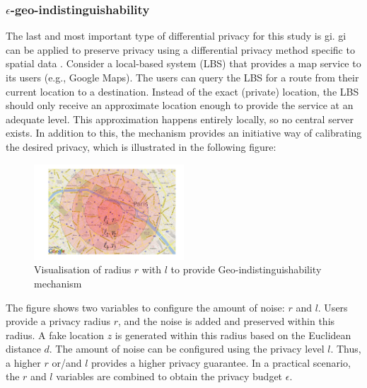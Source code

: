 \subsubsection{$\epsilon$-geo-indistinguishability} \label{theory:geo-indistinguishability}
The last and most important type of differential privacy for this study is \gls{gi}.
\gls{gi} can be applied to preserve privacy using a differential privacy method specific to spatial data \citep{DBLP:journals/corr/abs-1212-1984}.
Consider a local-based system (LBS) that provides a map service to its users (e.g., Google Maps).
The users can query the LBS for a route from their current location to a destination.
Instead of the exact (private) location, the LBS should only receive an approximate location enough to provide the service at an adequate level.
This approximation happens entirely locally, so no central server exists. \newline
In addition to this, the mechanism provides an initiative way of calibrating the desired privacy, which is illustrated in the following figure:
\begin{figure}[H]
  \includegraphics[width=0.5\textwidth]{TheorethicalFramework/geo-indistinguishability.png}
  \caption{Visualisation of radius $r$ with $l$ to provide Geo-indistinguishability mechanism \citep{DBLP:journals/corr/abs-1212-1984}}
  \label{fig:geo-indistinguishability}
\end{figure}
The figure shows two variables to configure the amount of noise: $r$ and $l$.
Users provide a privacy radius $r$, and the noise is added and preserved within this radius.
A fake location $z$ is generated within this radius based on the Euclidean distance $d$.
The amount of noise can be configured using the privacy level $l$.
Thus, a higher $r$ or/and $l$ provides a higher privacy guarantee. \newline
In a practical scenario, the $r$ and $l$ variables are combined to obtain the privacy budget $\epsilon$.
